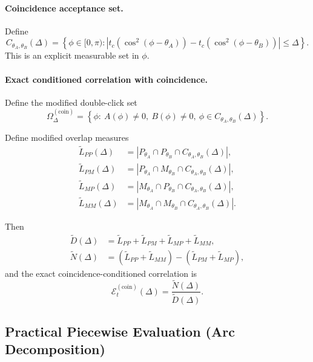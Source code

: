 \paragraph{Coincidence acceptance set.}
Define
\begin{equation}
C_{\theta_A,\theta_B}(\Delta)=
\left\{
\phi\in[0,\pi):
\left|
t_c\!\left(\cos^2(\phi-\theta_A)\right)
-
t_c\!\left(\cos^2(\phi-\theta_B)\right)
\right|
\le \Delta
\right\}.
\end{equation}
This is an explicit measurable set in $\phi$.

\paragraph{Exact conditioned correlation with coincidence.}
Define the modified double-click set
\begin{equation}
\Omega_{\Delta}^{\mathrm{(coin)}}=
\left\{
\phi:\ A(\phi)\neq 0,\ B(\phi)\neq 0,\ \phi\in C_{\theta_A,\theta_B}(\Delta)
\right\}.
\end{equation}

Define modified overlap measures
\begin{align}
\tilde L_{PP}(\Delta) &= |P_{\theta_A}\cap P_{\theta_B}\cap C_{\theta_A,\theta_B}(\Delta)|,\\
\tilde L_{PM}(\Delta) &= |P_{\theta_A}\cap M_{\theta_B}\cap C_{\theta_A,\theta_B}(\Delta)|,\\
\tilde L_{MP}(\Delta) &= |M_{\theta_A}\cap P_{\theta_B}\cap C_{\theta_A,\theta_B}(\Delta)|,\\
\tilde L_{MM}(\Delta) &= |M_{\theta_A}\cap M_{\theta_B}\cap C_{\theta_A,\theta_B}(\Delta)|.
\end{align}

Then
\begin{align}
\tilde D(\Delta) &= \tilde L_{PP}+\tilde L_{PM}+\tilde L_{MP}+\tilde L_{MM},\\
\tilde N(\Delta) &= (\tilde L_{PP}+\tilde L_{MM})-(\tilde L_{PM}+\tilde L_{MP}),
\end{align}
and the exact coincidence-conditioned correlation is
\begin{equation}
\boxed{
\mathcal{E}_t^{\mathrm{(coin)}}(\Delta)
=
\frac{\tilde N(\Delta)}{\tilde D(\Delta)}.
}
\end{equation}

\subsection{Practical Piecewise Evaluation (Arc Decomposition)}

